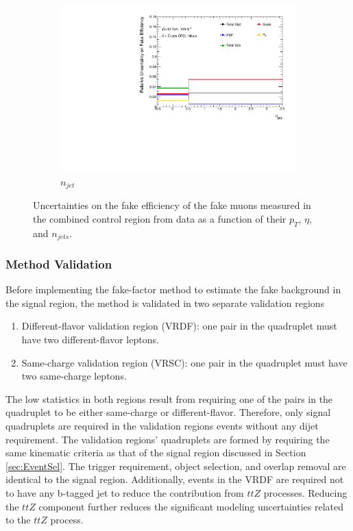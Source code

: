 \begin{figure}[!htb]
\begin{center}
\begin{subfigure}{.48\textwidth}
        \includegraphics[width=.95\linewidth]{figures/Analysis/Background/SystematicUncertainties3D_Muon_njet.pdf}
        \caption{$n_{jet}$ \label{fig:FakeUnc_njet_mu}}
    \end{subfigure}
    \end{center}
\caption{Uncertainties on the fake efficiency of the fake muons measured in the combined control region from data as a function of their $p_{T}$, $\eta$, and $n_{jets}$. \label{fig:FakeEffUnc_3D_Muon}}
\end{figure}

\subsubsection{Method Validation}
\label{subsubsec:Validation}
Before implementing the fake-factor method to estimate the fake background in the signal region, the method is validated in two separate validation regions
\begin{enumerate}
    \item{ Different-flavor validation region (VRDF): one pair in the quadruplet must have two different-flavor leptons.}
    \item{ Same-charge validation region (VRSC): one pair in the quadruplet must have two same-charge leptons.}
\end{enumerate}

The low statistics in both regions result from requiring one of the pairs in the quadruplet to be either same-charge or different-flavor. Therefore, only signal quadruplets are required in the validation regions events without any dijet requirement. The validation regions' quadruplets are formed by requiring the same kinematic criteria as that of the signal region discussed in Section \ref{sec:EventSel}. The trigger requirement, object selection, and overlap removal are identical to the signal region. Additionally, events in the VRDF are required not to have any b-tagged jet to reduce the contribution from $ttZ$ processes. Reducing the $ttZ$ component further reduces the significant modeling uncertainties related to the $ttZ$ process.


